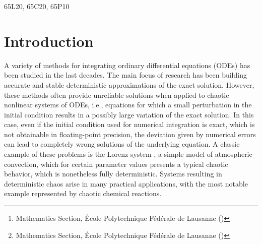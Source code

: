 \documentclass{siamart1116}
\title{{\TheTitle}}
\author{Assyr Abdulle\thanks{Mathematics Section, \'Ecole Polytechnique F\'ed\'erale de Lausanne (\email{assyr.abdulle@epfl.ch})}
		\and
		Giacomo Garegnani\thanks{Mathematics Section, \'Ecole Polytechnique F\'ed\'erale de Lausanne (\email{giacomo.garegnani@epfl.ch})}}
\numberwithin{theorem}{section}
\begin{document}
	
\maketitle	

\begin{abstract} 
	We present a novel probabilistic numerical method for the integration of ODEs based on random time step selection. Theoretical analysis investigating the properties of strong and weak convergence is fully developed. We show that the measure obtained with repeated sampling converges in mean-square sense independently of the number of samples. We present the geometric properties of conservation of polynomial first integrals and symplecticity, which constitute the main advantage with respect to an additive noise method \cite{CGS16}. A complete set of numerical experiments confirms our theoretical findings.
\end{abstract}

\begin{AMS} 65L20, 65C20, 65P10 \end{AMS}

\section{Introduction} 
A variety of methods for integrating ordinary differential equations (ODEs) has been studied in the last decades. The main focus of research has been building accurate and stable deterministic approximations of the exact solution. However, these methods often provide unreliable solutions when applied to chaotic nonlinear systems of ODEs, i.e., equations for which a small perturbation in the initial condition results in a possibly large variation of the exact solution. In this case, even if the initial condition used for numerical integration is exact, which is not obtainable in floating-point precision, the deviation given by numerical errors can lead to completely wrong solutions of the underlying equation. A classic example of these problems is the Lorenz system \cite{Lor63}, a simple model of atmospheric convection, which for certain parameter values presents a typical chaotic behavior, which is nonetheless fully deterministic. Systems resulting in deterministic chaos arise in many practical applications, with the most notable example represented by chaotic chemical reactions.
\end{document}
